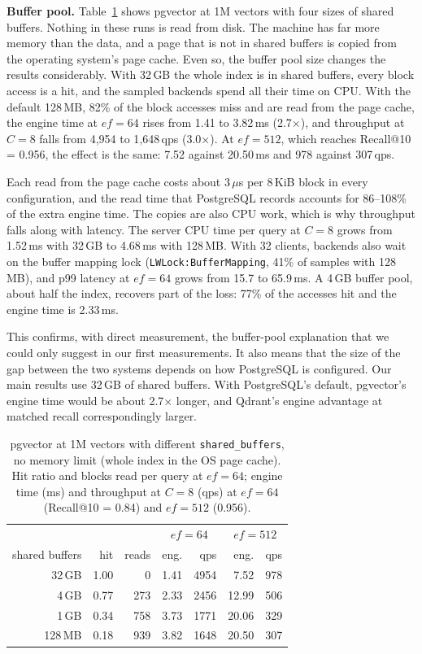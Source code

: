 \documentclass[sigconf, nonacm]{acmart}
\begin{document}
\textbf{Buffer pool.} Table~\ref{tab:sb} shows pgvector at 1M vectors with four sizes of
shared buffers. Nothing in these runs is read from disk. The machine has far more memory
than the data, and a page that is not in shared buffers is copied from the operating
system's page cache. Even so, the buffer pool size changes the results considerably.
With 32\,GB the whole index is in shared buffers, every block access is a hit, and the
sampled backends spend all their time on CPU. With the default 128\,MB, 82\% of the
block accesses miss and are read from the page cache, the engine time at $ef=64$ rises
from 1.41 to 3.82\,ms (2.7$\times$), and throughput at $C=8$ falls from 4{,}954 to
1{,}648\,qps (3.0$\times$). At $ef=512$, which reaches Recall@10 = 0.956, the effect is
the same: 7.52 against 20.50\,ms and 978 against 307\,qps.

Each read from the page cache costs about 3\,$\mu$s per 8\,KiB block in every
configuration, and the read time that PostgreSQL records accounts for 86--108\% of the
extra engine time. The copies are also CPU work, which is why throughput falls along
with latency. The server CPU time per query at $C=8$ grows from 1.52\,ms with 32\,GB to
4.68\,ms with 128\,MB. With 32 clients, backends also wait on the buffer mapping lock
(\texttt{LWLock:BufferMapping}, 41\% of samples with 128\,MB), and p99 latency at
$ef=64$ grows from 15.7 to 65.9\,ms. A 4\,GB buffer pool, about half the index, recovers
part of the loss: 77\% of the accesses hit and the engine time is 2.33\,ms.

This confirms, with direct measurement, the buffer-pool explanation that we could only
suggest in our first measurements. It also means that the size of the gap between the
two systems depends on how PostgreSQL is configured. Our main results use 32\,GB of
shared buffers. With PostgreSQL's default, pgvector's engine time would be about
2.7$\times$ longer, and Qdrant's engine advantage at matched recall correspondingly
larger.

\begin{table}[h]
  \caption{pgvector at 1M vectors with different \texttt{shared\_buffers}, no memory limit
  (whole index in the OS page cache). Hit ratio and blocks read per query at $ef=64$;
  engine time (ms) and throughput at $C=8$ (qps) at $ef=64$ (Recall@10 = 0.84) and
  $ef=512$ (0.956).}
  \label{tab:sb}
  \small
  \begin{tabular}{r|rr|rr|rr}
    \toprule
     & & & \multicolumn{2}{c|}{$ef=64$} & \multicolumn{2}{c}{$ef=512$} \\
    shared buffers & hit & reads & eng. & qps & eng. & qps \\
    \midrule
    32\,GB & 1.00 & 0 & 1.41 & 4954 & 7.52 & 978 \\
    4\,GB & 0.77 & 273 & 2.33 & 2456 & 12.99 & 506 \\
    1\,GB & 0.34 & 758 & 3.73 & 1771 & 20.06 & 329 \\
    128\,MB & 0.18 & 939 & 3.82 & 1648 & 20.50 & 307 \\
    \bottomrule
  \end{tabular}
\end{table}
\end{document}
